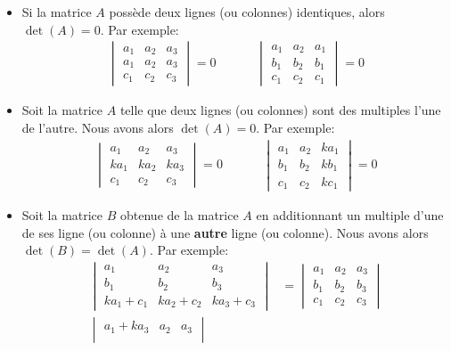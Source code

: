 \documentclass[]{book}
\theoremstyle{definition}
\theoremstyle{definition}
\theoremstyle{definition}
\theoremstyle{remark}
\begin{document}
\begin{itemize}
\item
  Si la matrice \(A\) possède deux lignes (ou colonnes) identiques, alors \(\det(A)=0\). Par exemple:
  \begin{align*}
  \begin{vmatrix}
  a_1 & a_2 & a_3 \\
  a_1 & a_2 & a_3 \\
  c_1 & c_2 & c_3
  \end{vmatrix}
  =
  0
  &
  \phantom{aaa}
  &
  \begin{vmatrix}
  a_1 & a_2 & a_1 \\
  b_1 & b_2 & b_1 \\
  c_1 & c_2 & c_1
  \end{vmatrix}
  =0
  \end{align*}
\item
  Soit la matrice \(A\) telle que deux lignes (ou colonnes) sont des multiples l'une de l'autre. Nous avons alors \(\det(A)=0\). Par exemple:
  \begin{align*}
  \begin{vmatrix}
  a_1 & a_2 & a_3 \\
  ka_1 & ka_2 & ka_3 \\
  c_1 & c_2 & c_3
  \end{vmatrix}
  =
  0
  &
  \phantom{aaa}
  &
  \begin{vmatrix}
  a_1 & a_2 & ka_1 \\
  b_1 & b_2 & kb_1 \\
  c_1 & c_2 & kc_1
  \end{vmatrix}
  =0
  \end{align*}
\item
  Soit la matrice \(B\) obtenue de la matrice \(A\) en additionnant un multiple d'une de ses ligne (ou colonne) à une \textbf{autre} ligne (ou colonne). Nous avons alors \(\det(B)=\det(A)\). Par exemple:
  \begin{align*}
  \begin{vmatrix}
  a_1 & a_2 & a_3 \\
  b_1 & b_2 & b_3 \\
  ka_1+c_1 & ka_2+c_2 & ka_3+c_3
  \end{vmatrix}
  &=
  \begin{vmatrix}
  a_1 & a_2 & a_3 \\
  b_1 & b_2 & b_3 \\
  c_1 & c_2 & c_3
  \end{vmatrix}
  \\
  \begin{vmatrix}
  a_1+ka_3 & a_2 & a_3 \\

\end{vmatrix}
\end{align*}
\end{itemize}
\end{document}
